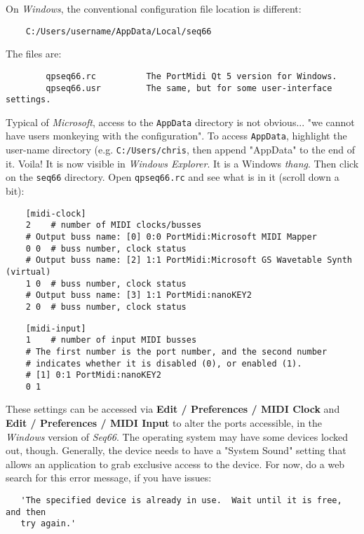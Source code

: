     On \textsl{Windows}, the conventional configuration file
    location is different:
    
\begin{verbatim}
    C:/Users/username/AppData/Local/seq66
\end{verbatim}

    The files are:

\begin{verbatim}
        qpseq66.rc          The PortMidi Qt 5 version for Windows.
        qpseq66.usr         The same, but for some user-interface settings.
\end{verbatim}

    Typical of \textsl{Microsoft}, access to the \texttt{AppData} directory
    is not obvious... "we cannot have users monkeying with the configuration".
    To access \texttt{AppData}, highlight the user-name directory
    (e.g. \texttt{C:/Users/chris}, then append
    "AppData" to the end of it.  Voila! It is now visible in
    \textsl{Windows Explorer}.
    It is a Windows \textsl{thang}.
    Then click on the \texttt{seq66} directory.
    Open \texttt{qpseq66.rc} and see what is in it (scroll down a bit):

\begin{verbatim}
    [midi-clock]
    2    # number of MIDI clocks/busses
    # Output buss name: [0] 0:0 PortMidi:Microsoft MIDI Mapper
    0 0  # buss number, clock status
    # Output buss name: [2] 1:1 PortMidi:Microsoft GS Wavetable Synth (virtual)
    1 0  # buss number, clock status
    # Output buss name: [3] 1:1 PortMidi:nanoKEY2
    2 0  # buss number, clock status
\end{verbatim}
    
\begin{verbatim}
    [midi-input]
    1    # number of input MIDI busses
    # The first number is the port number, and the second number
    # indicates whether it is disabled (0), or enabled (1).
    # [1] 0:1 PortMidi:nanoKEY2
    0 1
\end{verbatim}

   These settings can be accessed via
   \textbf{Edit / Preferences / MIDI Clock} and
   \textbf{Edit / Preferences / MIDI Input} to
	alter the ports accessible, in the \textsl{Windows}
   version of \textsl{Seq66}.
   The operating system may have some devices locked out, though.
   Generally, the device needs to have a "System Sound" setting that allows an
   application to grab exclusive access to the device.
   For now, do a web search for this error message, if you have issues:

\begin{verbatim}
   'The specified device is already in use.  Wait until it is free, and then
   try again.'
\end{verbatim}

